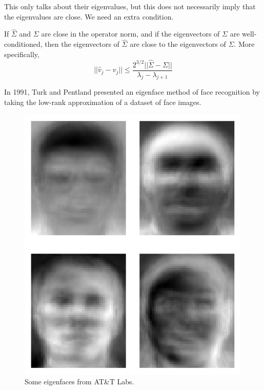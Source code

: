     This only talks about their eigenvalues, but this does not necessarily imply that the eigenvalues are close. We need an extra condition. 

    \begin{theorem}
      If $\hat{\Sigma}$ and $\Sigma$ are close in the operator norm, and if the eigenvectors of $\Sigma$ are well-conditioned, then the eigenvectors of $\hat{\Sigma}$ are close to the eigenvectors of $\Sigma$. More specifically, 
      \begin{equation}
        ||\hat{v}_j - v_j|| \leq \frac{2^{3/2} ||\hat{\Sigma} - \Sigma||}{\lambda_j - \lambda_{j+1}}
      \end{equation}
    \end{theorem}

    \begin{example}[Eigenfaces]
      In 1991, Turk and Pentland presented an eigenface method of face recognition by taking the low-rank approximation of a dataset of face images. 

      \begin{figure}[H]
        \centering 
        \includegraphics[scale=0.3]{img/eigenfaces.png}
        \caption{Some eigenfaces from AT\&T Labs. } 
        \label{fig:eigenfaces}
      \end{figure}
    \end{example}


